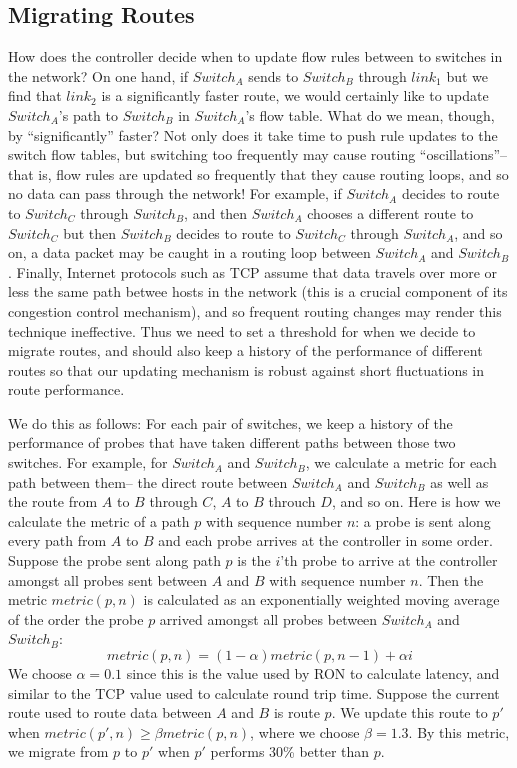 \documentclass[pageno]{jpaper}
\begin{document}
\subsection{Migrating Routes}

How does the controller decide when to update flow rules between to switches in the network?  On one hand,
if $Switch_A$ sends to $Switch_B$ through $link_1$ but we find that $link_2$ is a significantly faster 
route, we would certainly like to update $Switch_A$'s path to $Switch_B$ in $Switch_A$'s flow table. What do we mean,
though, by ``significantly'' faster?  Not only does it take time to push rule updates to the switch flow tables,
but switching too frequently may cause routing ``oscillations''--that is, flow rules are updated so frequently 
that they cause routing loops, and so no data can pass through the network! For example, if $Switch_A$ decides 
to route to $Switch_C$ through $Switch_B$, and then $Switch_A$ chooses a different route to $Switch_C$ but then
$Switch_B$ decides to route to $Switch_C$ through $Switch_A$, and so on, a data packet may be caught in a routing
loop between $Switch_A$ and $Switch_B$. Finally, Internet protocols such as TCP assume that data travels over
more or less the same path betwee hosts in the network (this is a crucial component of its congestion control 
mechanism), and so frequent routing changes may render this technique ineffective. Thus we need to set a threshold
for when we decide to migrate routes, and should also keep a history of the performance of different routes so that
our updating mechanism is robust against short fluctuations in route performance. 

We do this as follows:
For each pair of switches, we keep a history of the performance of probes that have taken different paths between
those two switches. For example, for $Switch_A$ and $Switch_B$, we calculate a metric for each path between them--
the direct route between $Switch_A$ and $Switch_B$ as well as the route from $A$ to $B$ through $C$, $A$ to $B$ 
throuch $D$, and so on. Here is how we calculate the metric of a path $p$ with sequence number $n$: a probe 
is sent along every path from $A$ to $B$ and each probe arrives at the controller in some order. Suppose the probe
sent along path $p$ is the $i$'th probe to arrive at the controller amongst all probes sent between $A$ and $B$ with
sequence number $n$. Then the metric $metric(p,n)$ is calculated as an exponentially weighted moving average of the order
the probe $p$ arrived amongst all probes between $Switch_A$ and $Switch_B$:
$$metric(p,n) = (1-\alpha )metric(p,n-1) + \alpha i$$
We choose $\alpha=0.1$ since this is the value used by RON to calculate latency\cite{ron}, and similar to the TCP
value used to calculate round trip time. Suppose the current route used to route data between $A$ and $B$ is 
route $p$. We update this route to $p'$ when $metric(p',n)\ge \beta metric(p,n)$, where we choose $\beta = 1.3$.
By this metric, we migrate from $p$ to $p'$ when $p'$ performs 30\% better than $p$.
\end{document}
